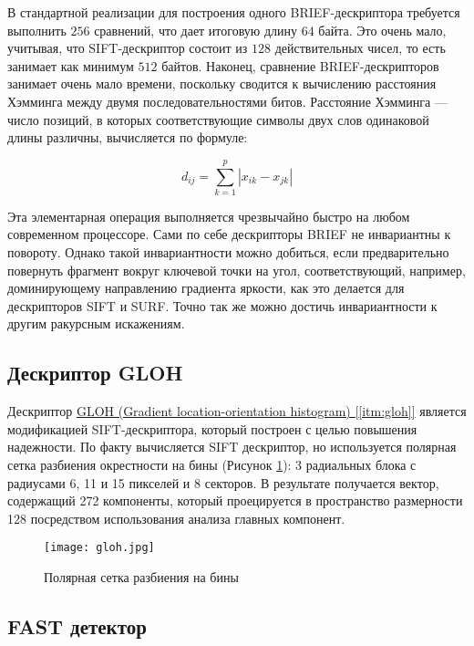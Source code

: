 В стандартной реализации для построения одного BRIEF-дескриптора требуется выполнить $256$ сравнений, что дает итоговую длину $64$ байта. Это очень мало, учитывая, что SIFT-дескриптор состоит из $128$ действительных чисел, то есть занимает как минимум $512$ байтов. Наконец, сравнение BRIEF-дескрипторов занимает очень мало времени, поскольку сводится к вычислению расстояния Хэмминга между двумя последовательностями битов. Расстояние Хэмминга — число позиций, в которых соответствующие символы двух слов одинаковой длины различны, вычисляется по формуле:

\begin{equation}
    d_{ij} = \sum_{k=1}^{p}|x_{ik} - x_{jk}|
\end{equation}

Эта элементарная операция выполняется чрезвычайно быстро на любом современном процессоре. Сами по себе дескрипторы BRIEF не инвариантны к повороту. Однако такой инвариантности можно добиться, если предварительно повернуть фрагмент вокруг ключевой точки на угол, соответствующий, например, доминирующему направлению градиента яркости, как это делается для дескрипторов SIFT и SURF. Точно так же можно достичь инвариантности к другим ракурсным искажениям.

\subsection{Дескриптор GLOH}

Дескриптор \hyperref[itm:gloh]{ GLOH (Gradient location-orientation histogram) [\ref{itm:gloh}]} является модификацией SIFT-дескриптора, который построен с целью повышения надежности. По факту вычисляется SIFT дескриптор, но используется полярная сетка разбиения окрестности на бины (Рисунок \ref{fig:gloh}): 3 радиальных блока с радиусами 6, 11 и 15 пикселей и 8 секторов. В результате получается вектор, содержащий 272 компоненты, который проецируется в пространство размерности 128 посредством использования анализа главных компонент.

\begin{figure}[h]
    \centering
    \texttt{[image: gloh.jpg]}
    \caption{Полярная сетка разбиения на бины}
    \label{fig:gloh}
\end{figure}

\subsection{FAST детектор}

